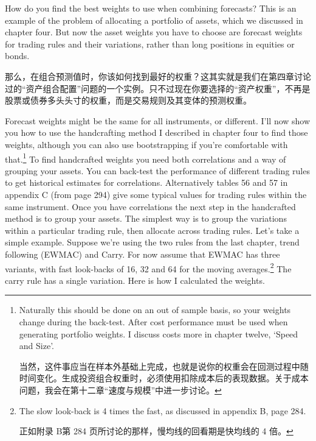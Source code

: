 
\begin{englishblock} How do you find the best weights to use when combining forecasts? This is an example of the problem of allocating a portfolio of assets, which we discussed in chapter four. But now the asset weights you have to choose are forecast weights for trading rules and their variations, rather than long positions in equities or bonds. \end{englishblock}

\begin{chineseblock}那么，在组合预测值时，你该如何找到最好的权重？这其实就是我们在第四章讨论过的“资产组合配置”问题的一个实例。只不过现在你要选择的“资产权重”，不再是股票或债券多头头寸的权重，而是交易规则及其变体的预测权重。\end{chineseblock}

\bipairgap

\begin{englishblock} Forecast weights might be the same for all instruments, or different. I'll now show you how to use the handcrafting method I described in chapter four to find those weights, although you can also use bootstrapping if you're comfortable with that.\footnote{Naturally this should be done on an out of sample basis, so your weights change during the back-test. After cost performance must be used when generating portfolio weights. I discuss costs more in chapter twelve, ‘Speed and Size'. \par 当然，这件事应当在样本外基础上完成，也就是说你的权重会在回测过程中随时间变化。生成投资组合权重时，必须使用扣除成本后的表现数据。关于成本问题，我会在第十二章“速度与规模”中进一步讨论。} To find handcrafted weights you need both correlations and a way of grouping your assets. You can back-test the performance of different trading rules to get historical estimates for correlations. Alternatively tables 56 and 57 in appendix C (from page 294) give some typical values for trading rules within the same instrument. Once you have correlations the next step in the handcrafted method is to group your assets. The simplest way is to group the variations within a particular trading rule, then allocate across trading rules. Let's take a simple example. Suppose we're using the two rules from the last chapter, trend following (EWMAC) and Carry. For now assume that EWMAC has three variants, with fast look-backs of 16, 32 and 64 for the moving averages.\footnote{The slow look-back is 4 times the fast, as discussed in appendix B, page 284. \par 正如附录 B第 284 页所讨论的那样，慢均线的回看期是快均线的 4 倍。} The carry rule has a single variation. Here is how I calculated the weights. \end{englishblock}

